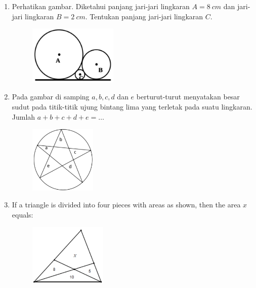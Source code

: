 \documentclass[11pt]{scrartcl}
\begin{document}
\begin{enumerate}
\vspace{6cm}\item Perhatikan gambar. Diketahui panjang jari-jari lingkaran $ A = 8\ cm $ dan jari-jari lingkaran $ B = 2\ cm $. Tentukan panjang jari-jari lingkaran $ C $.
\begin{figure}[h]
\centering
\includegraphics[width=0.4\textwidth]{StarGen/0Figure/3-tangent-circles.png}
\end{figure}


\vspace{6cm}\item Pada gambar di samping $ a, b, c, d $ dan $ e $ berturut-turut menyatakan besar sudut pada titik-titik ujung bintang lima yang terletak pada suatu lingkaran. Jumlah $ a + b + c + d + e = \ldots $
\begin{figure}[h]
\centering
\includegraphics[width=0.3\textwidth]{StarGen/0Figure/star-angle.png}
\end{figure}

\vspace{6cm}\item If a triangle is divided into four pieces with areas as shown, then the area $ x $ equals:
\begin{figure}[h]
\centering
\includegraphics[width=0.35\textwidth]{StarGen/0Figure/area-ratio-classic.png}
\end{figure}


\end{enumerate}
\end{document}
